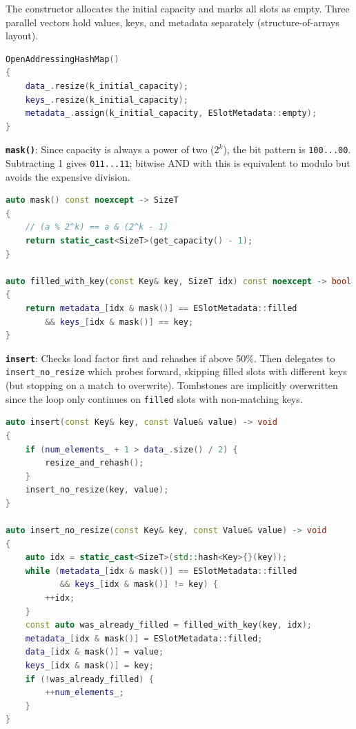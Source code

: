 \documentclass{article}
\begin{document}
The constructor allocates the initial capacity and marks all slots as empty. Three parallel vectors hold values, keys, and metadata separately (structure-of-arrays layout).

\begin{lstlisting}[language=cpp,caption={Constructor}]
OpenAddressingHashMap()
{
    data_.resize(k_initial_capacity);
    keys_.resize(k_initial_capacity);
    metadata_.assign(k_initial_capacity, ESlotMetadata::empty);
}
\end{lstlisting}

\textbf{\texttt{mask()}}: Since capacity is always a power of two ($2^k$), the bit pattern is \texttt{100...00}. Subtracting 1 gives \texttt{011...11}; bitwise AND with this is equivalent to modulo but avoids the expensive division.

\begin{lstlisting}[language=cpp,caption={Bitmask index and key check}]
auto mask() const noexcept -> SizeT
{
    // (a % 2^k) == a & (2^k - 1)
    return static_cast<SizeT>(get_capacity() - 1);
}

auto filled_with_key(const Key& key, SizeT idx) const noexcept -> bool
{
    return metadata_[idx & mask()] == ESlotMetadata::filled
        && keys_[idx & mask()] == key;
}
\end{lstlisting}

\textbf{\texttt{insert}}: Checks load factor first and rehashes if above 50\%. Then delegates to \texttt{insert\_no\_resize} which probes forward, skipping filled slots with different keys (but stopping on a match to overwrite). Tombstones are implicitly overwritten since the loop only continues on \texttt{filled} slots with non-matching keys.

\begin{lstlisting}[language=cpp,caption={insert and insert\_no\_resize}]
auto insert(const Key& key, const Value& value) -> void
{
    if (num_elements_ + 1 > data_.size() / 2) {
        resize_and_rehash();
    }
    insert_no_resize(key, value);
}

auto insert_no_resize(const Key& key, const Value& value) -> void
{
    auto idx = static_cast<SizeT>(std::hash<Key>{}(key));
    while (metadata_[idx & mask()] == ESlotMetadata::filled
           && keys_[idx & mask()] != key) {
        ++idx;
    }
    const auto was_already_filled = filled_with_key(key, idx);
    metadata_[idx & mask()] = ESlotMetadata::filled;
    data_[idx & mask()] = value;
    keys_[idx & mask()] = key;
    if (!was_already_filled) {
        ++num_elements_;
    }
}
\end{lstlisting}
\end{document}
